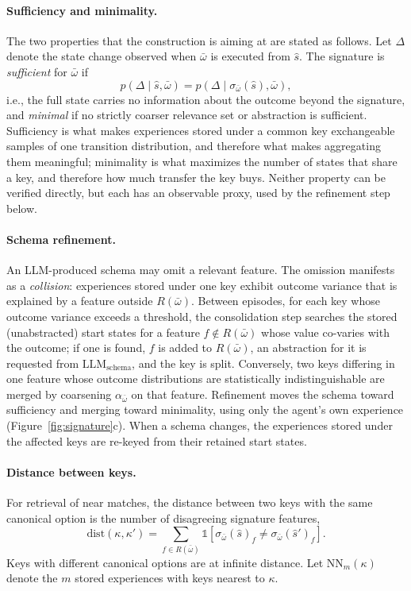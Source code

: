 \documentclass[11pt]{article}
\newcommand{\llm}[1]{\mathrm{LLM}_{\mathrm{#1}}}
\newcommand{\Rel}{R}
\newcommand{\shat}{\hat{s}}
\newcommand{\dist}{\mathrm{dist}}
\begin{document}
\paragraph{Sufficiency and minimality.}
The two properties that the construction is aiming at are stated as follows. Let $\Delta$ denote the state change observed when $\bar\omega$ is executed from $\shat$. The signature is \emph{sufficient} for $\bar\omega$ if
\begin{equation}
p(\Delta\mid\shat,\bar\omega)=p(\Delta\mid\sigma_{\bar\omega}(\shat),\bar\omega),
\label{eq:sufficient}
\end{equation}
i.e., the full state carries no information about the outcome beyond the signature, and \emph{minimal} if no strictly coarser relevance set or abstraction is sufficient. Sufficiency is what makes experiences stored under a common key exchangeable samples of one transition distribution, and therefore what makes aggregating them meaningful; minimality is what maximizes the number of states that share a key, and therefore how much transfer the key buys. Neither property can be verified directly, but each has an observable proxy, used by the refinement step below.

\paragraph{Schema refinement.}
An LLM-produced schema may omit a relevant feature. The omission manifests as a \emph{collision}: experiences stored under one key exhibit outcome variance that is explained by a feature outside $\Rel(\bar\omega)$. Between episodes, for each key whose outcome variance exceeds a threshold, the consolidation step searches the stored (unabstracted) start states for a feature $f\notin\Rel(\bar\omega)$ whose value co-varies with the outcome; if one is found, $f$ is added to $\Rel(\bar\omega)$, an abstraction for it is requested from $\llm{schema}$, and the key is split. Conversely, two keys differing in one feature whose outcome distributions are statistically indistinguishable are merged by coarsening $\alpha_{\bar\omega}$ on that feature. Refinement moves the schema toward sufficiency and merging toward minimality, using only the agent's own experience (Figure~\ref{fig:signature}c). When a schema changes, the experiences stored under the affected keys are re-keyed from their retained start states.

\paragraph{Distance between keys.}
For retrieval of near matches, the distance between two keys with the same canonical option is the number of disagreeing signature features,
\begin{equation}
\dist(\kappa,\kappa')=\textstyle\sum_{f\in\Rel(\bar\omega)}\mathbb{1}[\sigma_{\bar\omega}(\shat)_f\ne\sigma_{\bar\omega}(\shat')_f].
\label{eq:key-dist}
\end{equation}
Keys with different canonical options are at infinite distance. Let $\mathrm{NN}_m(\kappa)$ denote the $m$ stored experiences with keys nearest to $\kappa$.
\end{document}
